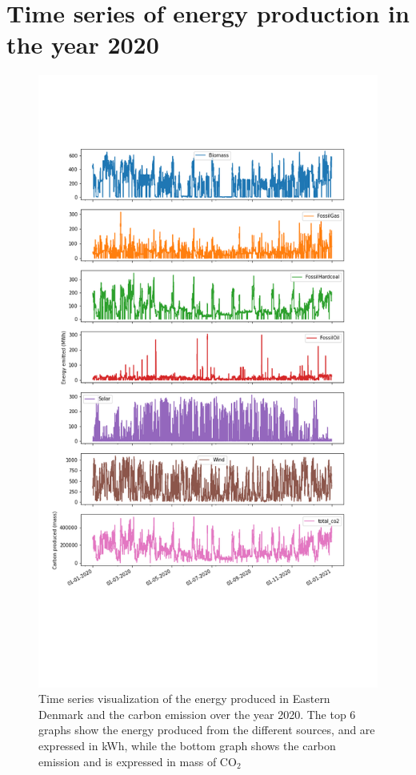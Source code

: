 \documentclass[11pt]{article} %
\begin{document}
\clearpage\newpage
\section{Time series of energy production in the year 2020}\label{app:time_serie}
\begin{figure}[h!]
  \includegraphics[width=0.7\linewidth]{../outputs/energy_production_time_serie.png}
  \caption{Time series visualization of the energy produced in Eastern Denmark and the carbon emission over the year 2020. The top 6 graphs show the energy produced from the different sources, and are expressed in kWh, while the bottom graph shows the carbon emission and is expressed in mass of CO$_2$}
  \label{fig:time_series}
\end{figure}
\end{document}
